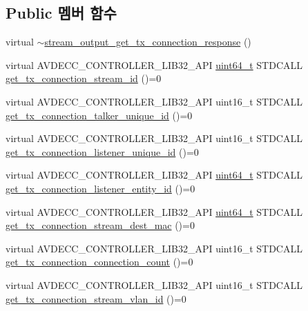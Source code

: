 \subsection*{Public 멤버 함수}
\begin{DoxyCompactItemize}
\item 
virtual \hyperlink{classavdecc__lib_1_1stream__output__get__tx__connection__response_a91c5b8aaad524ebc64217ba3316d0614}{$\sim$stream\+\_\+output\+\_\+get\+\_\+tx\+\_\+connection\+\_\+response} ()
\item 
virtual A\+V\+D\+E\+C\+C\+\_\+\+C\+O\+N\+T\+R\+O\+L\+L\+E\+R\+\_\+\+L\+I\+B32\+\_\+\+A\+PI \hyperlink{parse_8c_aec6fcb673ff035718c238c8c9d544c47}{uint64\+\_\+t} S\+T\+D\+C\+A\+LL \hyperlink{classavdecc__lib_1_1stream__output__get__tx__connection__response_a41e8408f2d3675cf07e20f804cacbd4e}{get\+\_\+tx\+\_\+connection\+\_\+stream\+\_\+id} ()=0
\item 
virtual A\+V\+D\+E\+C\+C\+\_\+\+C\+O\+N\+T\+R\+O\+L\+L\+E\+R\+\_\+\+L\+I\+B32\+\_\+\+A\+PI uint16\+\_\+t S\+T\+D\+C\+A\+LL \hyperlink{classavdecc__lib_1_1stream__output__get__tx__connection__response_a3c2600ed72ae5bd7dde5cec2a78e2087}{get\+\_\+tx\+\_\+connection\+\_\+talker\+\_\+unique\+\_\+id} ()=0
\item 
virtual A\+V\+D\+E\+C\+C\+\_\+\+C\+O\+N\+T\+R\+O\+L\+L\+E\+R\+\_\+\+L\+I\+B32\+\_\+\+A\+PI uint16\+\_\+t S\+T\+D\+C\+A\+LL \hyperlink{classavdecc__lib_1_1stream__output__get__tx__connection__response_a2f904ba7079c467dd2cbb6351d972a2e}{get\+\_\+tx\+\_\+connection\+\_\+listener\+\_\+unique\+\_\+id} ()=0
\item 
virtual A\+V\+D\+E\+C\+C\+\_\+\+C\+O\+N\+T\+R\+O\+L\+L\+E\+R\+\_\+\+L\+I\+B32\+\_\+\+A\+PI \hyperlink{parse_8c_aec6fcb673ff035718c238c8c9d544c47}{uint64\+\_\+t} S\+T\+D\+C\+A\+LL \hyperlink{classavdecc__lib_1_1stream__output__get__tx__connection__response_a01f0b3e593ca155a3312254e18123218}{get\+\_\+tx\+\_\+connection\+\_\+listener\+\_\+entity\+\_\+id} ()=0
\item 
virtual A\+V\+D\+E\+C\+C\+\_\+\+C\+O\+N\+T\+R\+O\+L\+L\+E\+R\+\_\+\+L\+I\+B32\+\_\+\+A\+PI \hyperlink{parse_8c_aec6fcb673ff035718c238c8c9d544c47}{uint64\+\_\+t} S\+T\+D\+C\+A\+LL \hyperlink{classavdecc__lib_1_1stream__output__get__tx__connection__response_a2530981730f87395de90a5c1bc09ceee}{get\+\_\+tx\+\_\+connection\+\_\+stream\+\_\+dest\+\_\+mac} ()=0
\item 
virtual A\+V\+D\+E\+C\+C\+\_\+\+C\+O\+N\+T\+R\+O\+L\+L\+E\+R\+\_\+\+L\+I\+B32\+\_\+\+A\+PI uint16\+\_\+t S\+T\+D\+C\+A\+LL \hyperlink{classavdecc__lib_1_1stream__output__get__tx__connection__response_a6523c8f1c4608c93fcfc5fedbfd3a330}{get\+\_\+tx\+\_\+connection\+\_\+connection\+\_\+count} ()=0
\item 
virtual A\+V\+D\+E\+C\+C\+\_\+\+C\+O\+N\+T\+R\+O\+L\+L\+E\+R\+\_\+\+L\+I\+B32\+\_\+\+A\+PI uint16\+\_\+t S\+T\+D\+C\+A\+LL \hyperlink{classavdecc__lib_1_1stream__output__get__tx__connection__response_a7f6acaf156e2a6e50cdfa1b9ea0e008e}{get\+\_\+tx\+\_\+connection\+\_\+stream\+\_\+vlan\+\_\+id} ()=0
\end{DoxyCompactItemize}


